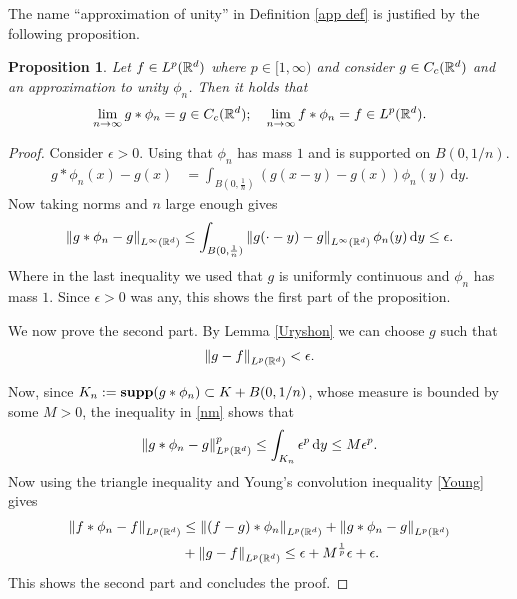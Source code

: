 \documentclass[12pt]{article}
\newtheorem{proposition}{Proposition}
\theoremstyle{remark}
\renewcommand{\norm}[1]{\left\lVert #1 \right\rVert}\renewcommand{\abs}[1]{\left| #1 \right|}
\renewcommand{\d}{\,\mathrm{d}}
\begin{document}
The name ``approximation of unity'' in Definition \ref{app def} is justified by the following proposition.
\begin{proposition}\label{app pn}
	Let $f \in L^p(\mathbb{R}^d)$ where $p \in [1,\infty)$ and consider $g \in C_c(\mathbb{R}^d)$ and an approximation to unity $\phi_n$. Then it holds that
	\begin{align*}
		\lim_{n \to \infty}g*\phi_n=g \in  C_c(\mathbb{R}^d);\quad \lim_{n \to \infty}f*\phi_n=f \in  L^p(\mathbb{R}^d).
	\end{align*}
\end{proposition}
\begin{proof}
	Consider $\epsilon >0$. Using that $\phi_n$ has mass $1$ and is supported on  $B(0,1/n)$.
	\begin{align*}
		g*\phi_n(x)-g(x) & = \int_{B(0, \frac{1}{n})}(g(x-y)-g(x)) \phi_n(y) \d y
		.
	\end{align*}
	Now taking norms and $n$ large enough gives
	\begin{align}\label{nm}
		\norm{g*\phi_n-g}_{L^\infty(\R^d)} \leq \int_{B(0, \frac{1}{n})} \norm{g(\cdot -y) -g}_{L^\infty(\R^d)} \phi_n(y) \d y\leq \epsilon   .
	\end{align}
	Where in the last inequality we used that $g$ is uniformly continuous and $\phi_n$ has mass $1$. Since $\epsilon >0$ was any, this shows the first part of the proposition.

	We now prove the second part. By Lemma \ref{Uryshon} we can choose $g $ such that
	\begin{align*}
		\norm{g-f}_{L^p(\R^d)}<\epsilon .
	\end{align*}


	Now, since $K_n:=\mathbf{supp}(g* \phi_n) \subset K + B(0, 1 /n)$, whose measure is bounded by some $M>0$, the inequality in  \eqref{nm} shows that
	\begin{align*}
		\norm{g*\phi_n-g}_{L^p(\R^d)}^p \leq \int_{K_n} \epsilon^p   \d y\leq M\epsilon^p  .
	\end{align*}
	Now using the triangle inequality and  Young's convolution inequality \ref{Young} gives
	\begin{align*}
		\norm{f*\phi_n-f}_{L^p(\R^d)} & \leq\norm{(f-g)*\phi_n}_{L^p(\R^d)}+\norm{g*\phi_n-g}_{L^p(\R^d)}          \\
		                              & +\norm{g-f}_{L^p(\R^d)}\leq \epsilon + M^{\frac{1}{p}}\epsilon +\epsilon .
	\end{align*}
	This shows the second part and concludes the proof.
\end{proof}
\end{document}
